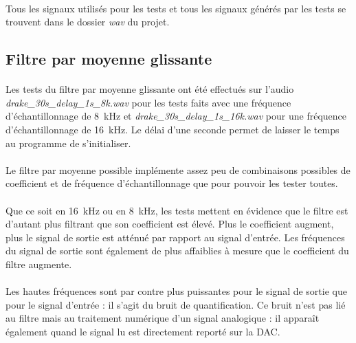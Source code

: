 \documentclass{article}
\begin{document}
    \paragraph{}
    Tous les signaux utilisés pour les tests et tous les signaux générés par les tests se trouvent dans le dossier \emph{wav} du projet.


    \subsection{Filtre par moyenne glissante}
    \paragraph{}
    Les tests du filtre par moyenne glissante ont été effectués sur l'audio \emph{drake\_30s\_delay\_1s\_8k.wav} pour les tests faits avec une fréquence d'échantillonnage de \SI{8}{\kilo\hertz} et \emph{drake\_30s\_delay\_1s\_16k.wav} pour une fréquence d'échantillonnage de \SI{16}{\kilo\hertz}. Le délai d'une seconde permet de laisser le temps au programme de s'initialiser.

    \paragraph{}
    Le filtre par moyenne possible implémente assez peu de combinaisons possibles de coefficient et de fréquence d'échantillonnage que pour pouvoir les tester toutes.

    \paragraph{}
    Que ce soit en \SI{16}{\kilo\hertz} ou en \SI{8}{\kilo\hertz}, les tests mettent en évidence que le filtre est d'autant plus filtrant que son coefficient est élevé. Plus le coefficient augment, plus le signal de sortie est atténué par rapport au signal d'entrée. Les fréquences du signal de sortie sont également de plus affaiblies à mesure que le coefficient du filtre augmente.

    \paragraph{}
    Les hautes fréquences sont par contre plus puissantes pour le signal de sortie que pour le signal d'entrée : il s'agit du bruit de quantification. Ce bruit n'est pas lié au filtre mais au traitement numérique d'un signal analogique : il apparaît également quand le signal lu est directement reporté sur la DAC.
\end{document}

